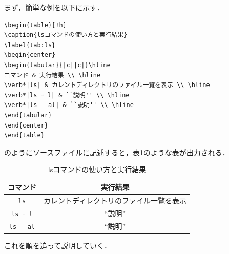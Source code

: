 まず，簡単な例を以下に示す．
\begin{screen}
\begin{verbatim}
\begin{table}[!h]
\caption{lsコマンドの使い方と実行結果}
\label{tab:ls}
\begin{center}
\begin{tabular}{|c||c|}\hline
コマンド & 実行結果 \\ \hline
\verb*|ls| & カレントディレクトリのファイル一覧を表示 \\ \hline
\verb*|ls ｰ l| & ``説明'' \\ \hline
\verb*|ls - al| & ``説明'' \\ \hline
\end{tabular}
\end{center}
\end{table}
\end{verbatim}
\end{screen}
のようにソースファイルに記述すると，表\ref{tab:ls}のような表が出力される．
\begin{table}[!h]
\caption{lsコマンドの使い方と実行結果}
\label{tab:ls}
\begin{center}
\begin{tabular}{|c||c|}\hline
コマンド & 実行結果 \\ \hline
\verb*|ls| & カレントディレクトリのファイル一覧を表示 \\ \hline
\verb*|ls ｰ l| & ``説明'' \\ \hline
\verb*|ls - al| & ``説明'' \\ \hline
\end{tabular}
\end{center}
\end{table}
これを順を追って説明していく．
